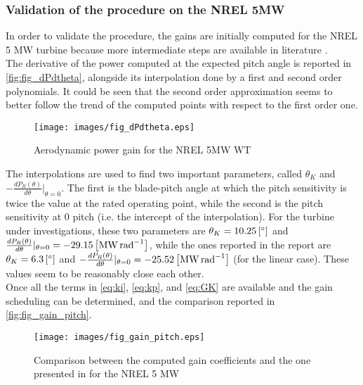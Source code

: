 \subsubsection{Validation of the procedure on the NREL 5MW}\label{subsec:gain_schdeuling_NREL5MW}
In order to validate the procedure, the gains are initially computed for the NREL 5 MW turbine because more intermediate steps are available in literature \cite{NREL_5MW_reference}.\\
The derivative of the power computed at the expected pitch angle is  reported in \autoref{fig:fig_dPdtheta}, alongside its interpolation done by a first and second order polynomials. It could be seen that the second order approximation seems to better follow the trend of the computed points with respect to the first order one. 
\begin{figure}[htb]
    \centering
    \texttt{[image: images/fig\_dPdtheta.eps]}
    \caption{Aerodynamic power gain for the NREL 5MW WT}
    \label{fig:fig_dPdtheta}
\end{figure}

The interpolations are used to find two important parameters, called $\theta_{K}$ and  $-\frac{dP_R(\theta)}{d\theta}\vert_{\theta=0}$. The first is the blade-pitch angle at which the pitch sensitivity is twice the value at the rated operating point, while the second is the pitch sensitivity at 0 pitch (i.e. the intercept of the interpolation). For the turbine under investigations, these two parameters are $\theta_K=10.25 \left[\si{\degree}\right]$ and  $\frac{dP_R(\theta)}{d\theta}\vert_{\theta=0} = -29.15 \left[\si{\mega\watt\per\radian}\right]$, while the ones reported in the report are $\theta_K=6.3 \left[\si{\degree}\right]$ and  $-\frac{dP_R(\theta)}{d\theta}\vert_{\theta=0} = -25.52\left[\si{\mega\watt\per\radian}\right]$ (for the linear case). These values seem to be reasonably close each other.\\ 
Once all the terms in \autoref{eq:ki}, \ref{eq:kp}, and \ref{eq:GK} are available and the gain scheduling can be determined, and the comparison reported in \autoref{fig:fig_gain_pitch}.
\begin{figure}[htb]
    \centering
    \texttt{[image: images/fig\_gain\_pitch.eps]}
    \caption{Comparison between the computed gain coefficients and the one presented in \cite{NREL_5MW_reference} for the NREL 5 MW}
    \label{fig:fig_gain_pitch}
\end{figure}


